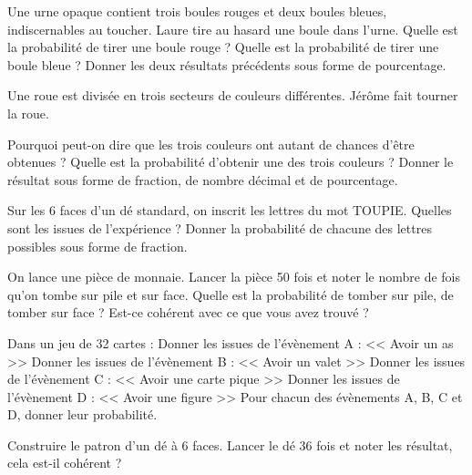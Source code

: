 \documentclass[../Cours.tex]{subfiles}
\begin{document}
\begin{questions}
    \exercice Une urne opaque contient trois boules rouges et deux boules bleues, indiscernables au toucher. Laure tire au hasard une boule dans l'urne.
    \question Quelle est la probabilité de tirer une boule rouge ?
    \question Quelle est la probabilité de tirer une boule bleue ?
    \question Donner les deux résultats précédents sous forme de pourcentage.
    
    \exercice Une roue est divisée en trois secteurs de couleurs différentes. Jérôme fait tourner la roue.
    
    \question Pourquoi peut-on dire que les trois couleurs ont autant de chances d'être obtenues ?
    \question Quelle est la probabilité d'obtenir une des trois couleurs ? Donner le résultat sous forme de fraction, de nombre décimal et de pourcentage.
    
    
    \begin{center}
    \end{center}
    
    \exercice Sur les 6 faces d'un dé standard, on inscrit les lettres du mot TOUPIE.
    \question Quelles sont les issues de l'expérience ?
    \question Donner la probabilité de chacune des lettres possibles sous forme de fraction.
    
    \exercice On lance une pièce de monnaie. 
    \question Lancer la pièce 50 fois et noter le nombre de fois qu'on tombe sur pile et sur face.
    \question Quelle est la probabilité de tomber sur pile, de tomber sur face ?
    \question Est-ce cohérent avec ce que vous avez trouvé ?
    
    \exercice Dans un jeu de 32 cartes :
    \question Donner les issues de l'évènement A : << Avoir un as >>
    \question Donner les issues de l'évènement B : << Avoir un valet >>
    \question Donner les issues de l'évènement C : << Avoir une carte pique >>
    \question Donner les issues de l'évènement D : << Avoir une figure >>
    \question Pour chacun des évènements A, B, C et D, donner leur probabilité.
    
    \exercice 
    \question Construire le patron d'un dé à 6 faces.
    \question Lancer le dé 36 fois et noter les résultat, cela est-il cohérent ?

\end{questions}
\end{document}
